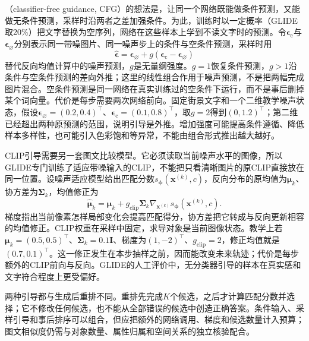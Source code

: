 （classifier-free guidance, CFG）的想法是，让同一个网络既能做条件预测，又能做无条件预测，采样时沿两者之差加强条件。为此，训练时以一定概率（GLIDE取20\%）把文字替换为空序列，网络在这些样本上学到不读文字时的预测。令$\bm\epsilon_{\mathrm c}$与$\bm\epsilon_{\varnothing}$分别表示同一带噪图片、同一噪声步上的条件与空条件预测，采样时用
\begin{equation}
  \widehat{\bm\epsilon}
     =\bm\epsilon_{\varnothing}
        +g(\bm\epsilon_{\mathrm c}-\bm\epsilon_{\varnothing})
  \label{eq:vision-glide-cfg-interface}
\end{equation}
替代反向均值计算中的噪声预测，$g$是无量纲强度。$g=1$恢复条件预测，$g>1$沿条件与空条件预测的差向外推；这里的线性组合作用于噪声预测，不是把两幅完成图片混合。空条件预测是同一网络在真实训练过的空条件下运行，而不是事后删掉某个词向量。代价是每步需要两次网络前向。固定街景文字和一个二维教学噪声状态，假设$\bm\epsilon_{\varnothing}=(0.2,0.4)^\top$、$\bm\epsilon_{\mathrm c}=(0.1,0.8)^\top$，取$g=2$得到$(0,1.2)^\top$；第二维已经超出两种原预测的范围，说明引导是外推。增加强度可能提高条件遵循、降低样本多样性，也可能引入色彩饱和等异常，不能由组合形式推出越大越好。

CLIP引导需要另一套图文比较模型。它必须读取当前噪声水平的图像，所以GLIDE专门训练了适应带噪输入的CLIP，不能把只看清晰图片的原CLIP直接放在同一位置。设噪声适应模型给出匹配分数$s_{\bm\phi}(\bm x^{(k)},c)$，反向分布的原均值为$\bm\mu_k$、协方差为$\bm\Sigma_k$，均值修正为
\begin{equation}
  \widehat{\bm\mu}_k
   =\bm\mu_k+g_{\mathrm{clip}}\bm\Sigma_k
           \nabla_{\bm x^{(k)}}s_{\bm\phi}(\bm x^{(k)},c).
  \label{eq:vision-glide-clip-interface}
\end{equation}
梯度指出当前像素怎样局部变化会提高匹配得分，协方差把它转成与反向更新相容的均值修正。CLIP权重在采样中固定，求导对象是当前图像状态。教学上若$\bm\mu_k=(0.5,0.5)^\top$、$\bm\Sigma_k=0.1\bm I$、梯度为$(1,-2)^\top$、$g_{\mathrm{clip}}=2$，修正均值就是$(0.7,0.1)^\top$。这一修正发生在本步抽样之前，因而能改变未来轨迹；代价是每步额外的CLIP前向与反向。GLIDE的人工评价中，无分类器引导的样本在真实感和文字符合程度上更受偏好。

两种引导都与生成后重排不同。重排先完成$K$个候选，之后才计算匹配分数并选择；它不修改任何候选，也不能从全部错误的候选中创造正确答案。条件输入、采样引导和事后排序可以组合，但应把额外的网络调用、梯度和候选数量计入预算；图文相似度仍需与对象数量、属性归属和空间关系的独立核验配合。

